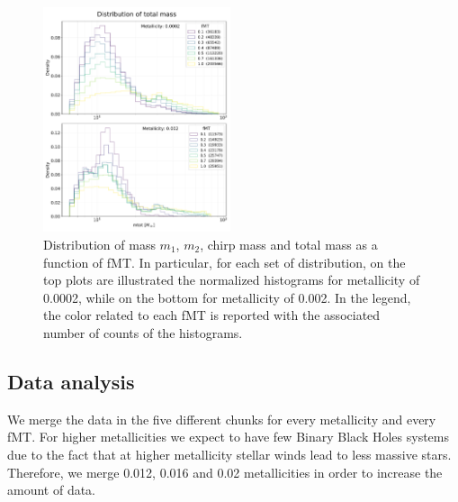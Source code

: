 \documentclass[prb,twocolumn,9pt]{revtex4-1}
\begin{document}
\begin{figure}[htp]
   \hskip 1mm
   \includegraphics[width=0.49\textwidth]{images/assignment1/hist_mass_tot.pdf}
   \vskip 0.3cm
    \caption{Distribution of mass \(m_1\), \(m_2\), chirp mass and total mass as a function of fMT. In particular, for each set of distribution, on the top plots are illustrated the normalized histograms for metallicity of 0.0002, while on the bottom for metallicity of 0.002. In the legend, the color related to each fMT is reported  with the associated number of counts of the histograms.}
    \label{fig:ass1_masses}
\end{figure}

\subsection{Data analysis}
We merge the data in the five different chunks for every metallicity and every fMT. 
For higher metallicities we expect to have few Binary Black Holes systems due to the fact that at higher metallicity stellar winds  lead to less massive stars. Therefore, we merge 0.012, 0.016 and 0.02 metallicities in order to increase the amount of data.
\end{document}
